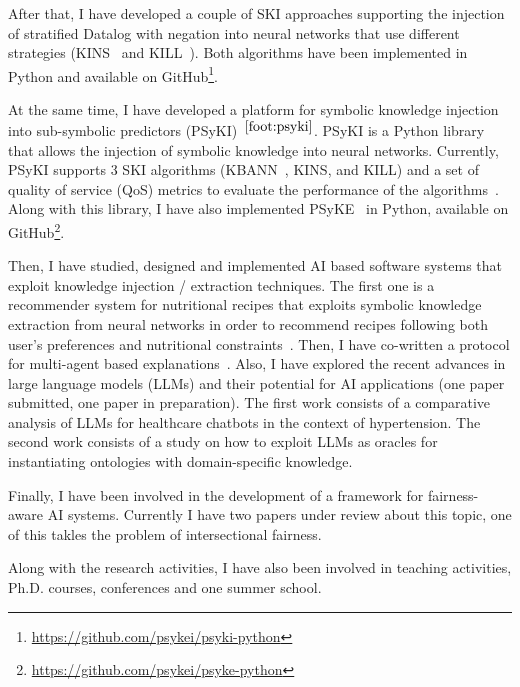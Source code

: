 \documentclass[]{scrartcl}
\begin{document}
    After that, I have developed a couple of SKI approaches supporting the injection of stratified Datalog with negation into neural networks that use different strategies (KINS~\cite{kins-cilc2022} and KILL~\cite{kill-woa2022}).
    Both algorithms have been implemented in Python and available on GitHub\footnote{\label{foot:psyki}\url{https://github.com/psykei/psyki-python}}.

    At the same time, I have developed a platform for symbolic knowledge injection into sub-symbolic predictors (PSyKI)~\cite{psyki-extraamas2022}$^{\ref{foot:psyki}}$.
    PSyKI is a Python library that allows the injection of symbolic knowledge into neural networks.
    Currently, PSyKI supports 3 SKI algorithms (KBANN~\cite{TowellAaai1990}, KINS, and KILL) and a set of quality of service (QoS) metrics to evaluate the performance of the algorithms~\cite{skiqos-jaamas37}.
    Along with this library, I have also implemented PSyKE~\cite{psyke-woa2021} in Python, available on GitHub\footnote{\label{foot:psyke}\url{https://github.com/psykei/psyke-python}}.

    Then, I have studied, designed and implemented AI based software systems that exploit knowledge injection / extraction techniques.
    The first one is a recommender system for nutritional recipes that exploits symbolic knowledge extraction from neural networks in order to recommend recipes following both user's preferences and nutritional constraints~\cite{skerecommender-cmbp235}.
    Then, I have co-written a protocol for multi-agent based explanations~\cite{explanationprotocol-extraamas2023}.
    Also, I have explored the recent advances in large language models (LLMs) and their potential for AI applications (one paper submitted, one paper in preparation).
    The first work consists of a comparative analysis of LLMs for healthcare chatbots in the context of hypertension.
    The second work consists of a study on how to exploit LLMs as oracles for instantiating ontologies with domain-specific knowledge.

    Finally, I have been involved in the development of a framework for fairness-aware AI systems.
    Currently I have two papers under review about this topic, one of this takles the problem of intersectional fairness.

    Along with the research activities, I have also been involved in teaching activities, Ph.D. courses, conferences and one summer school.
\end{document}
